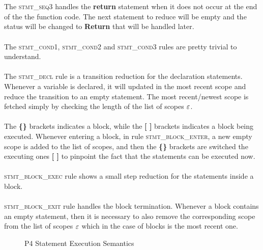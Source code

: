 \documentclass[UTF8]{article}
\begin{document}
\\~\\
The \textsc{stmt\_seq3} handles the \textbf{return} statement when it does not occur at the end of the the function code. The next statement to reduce will be empty and the status will be changed to \textbf{Return} that will be handled later.
\\~\\
The \textsc{stmt\_cond1}, \textsc{stmt\_cond2} and \textsc{stmt\_cond3} rules are pretty trivial to understand.
\\~\\
The \textsc{stmt\_decl} rule is a transition reduction for the declaration statements. Whenever a variable is declared, it will updated in the most recent scope and reduce the transition to an empty statement. The most recent/newest scope is fetched simply by checking the length of the list of scopes $\varepsilon$. 
\\~\\
The \textbf{\{\}} brackets indicates a block, while the \textbf{[ ]} brackets indicates a block being executed.
Whenever entering a block, in rule \textsc{stmt\_block\_enter}, a new empty scope is added to the list of scopes, and then the \textbf{\{\}} brackets are switched the executing ones \textbf{[ ]} to pinpoint the fact that the statements can be executed now.
\\~\\
\textsc{stmt\_block\_exec} rule shows a small step reduction for the statements inside a block.
\\~\\
\textsc{stmt\_block\_exit} rule handles the block termination. Whenever a block contains an empty statement, then it is necessary to also remove the corresponding scope from the list of scopes $\varepsilon$ which in the case of blocks is the most recent one.


\begin{figure}[ht!]
\ottdefnsstmtXXsem
\caption{P4 Statement Execution Semantics}
\label{fig:semstmtexec}
\end{figure}

%
%
\end{document}
